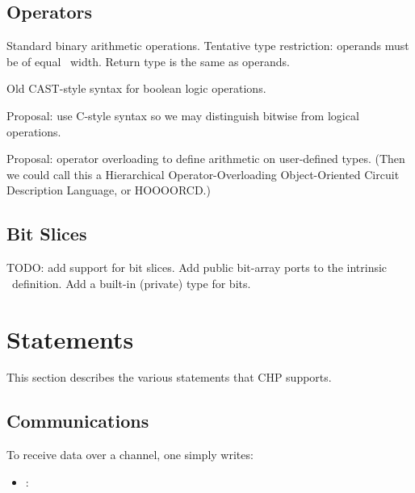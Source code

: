 \subsection{Operators}
\label{sec:chp:expr:ops}

Standard binary arithmetic operations.  
Tentative type restriction: operands must be of equal \int\ width.  
Return type is the same as operands.  

Old CAST-style syntax for boolean logic operations.  

Proposal: use C-style syntax so we may distinguish bitwise from 
logical operations.  

Proposal: operator overloading to define arithmetic on user-defined types.  
(Then we could call this a Hierarchical Operator-Overloading Object-Oriented
Circuit Description Language, or HOOOORCD.)

\subsection{Bit Slices}
\label{sec:chp:expr:bits}

TODO: add support for bit slices.  
Add public bit-array ports to the intrinsic \int\ definition.  
Add a built-in (private) type for bits.  

\section{Statements}
\label{sec:chp:stmts}

This section describes the various statements that CHP supports.  

\subsection{Communications}
\label{sec:chp:stmts:comm}

To receive data over a channel, one simply writes: 

\begin{itemize}
\item {} :  \query
	\ttt{(}  \ttt{)}
\end{itemize}


